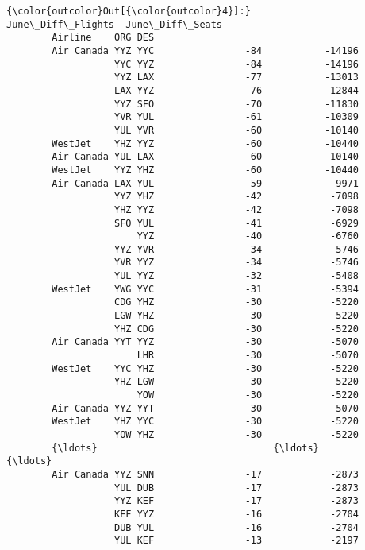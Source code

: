 \documentclass[11pt]{article}
\begin{document}
\begin{Verbatim}[commandchars=\\\{\}]
{\color{outcolor}Out[{\color{outcolor}4}]:}                     June\_Diff\_Flights  June\_Diff\_Seats
        Airline    ORG DES                                    
        Air Canada YYZ YYC                -84           -14196
                   YYC YYZ                -84           -14196
                   YYZ LAX                -77           -13013
                   LAX YYZ                -76           -12844
                   YYZ SFO                -70           -11830
                   YVR YUL                -61           -10309
                   YUL YVR                -60           -10140
        WestJet    YHZ YYZ                -60           -10440
        Air Canada YUL LAX                -60           -10140
        WestJet    YYZ YHZ                -60           -10440
        Air Canada LAX YUL                -59            -9971
                   YYZ YHZ                -42            -7098
                   YHZ YYZ                -42            -7098
                   SFO YUL                -41            -6929
                       YYZ                -40            -6760
                   YYZ YVR                -34            -5746
                   YVR YYZ                -34            -5746
                   YUL YYZ                -32            -5408
        WestJet    YWG YYC                -31            -5394
                   CDG YHZ                -30            -5220
                   LGW YHZ                -30            -5220
                   YHZ CDG                -30            -5220
        Air Canada YYT YYZ                -30            -5070
                       LHR                -30            -5070
        WestJet    YYC YHZ                -30            -5220
                   YHZ LGW                -30            -5220
                       YOW                -30            -5220
        Air Canada YYZ YYT                -30            -5070
        WestJet    YHZ YYC                -30            -5220
                   YOW YHZ                -30            -5220
        {\ldots}                               {\ldots}              {\ldots}
        Air Canada YYZ SNN                -17            -2873
                   YUL DUB                -17            -2873
                   YYZ KEF                -17            -2873
                   KEF YYZ                -16            -2704
                   DUB YUL                -16            -2704
                   YUL KEF                -13            -2197

\end{Verbatim}
\end{document}
